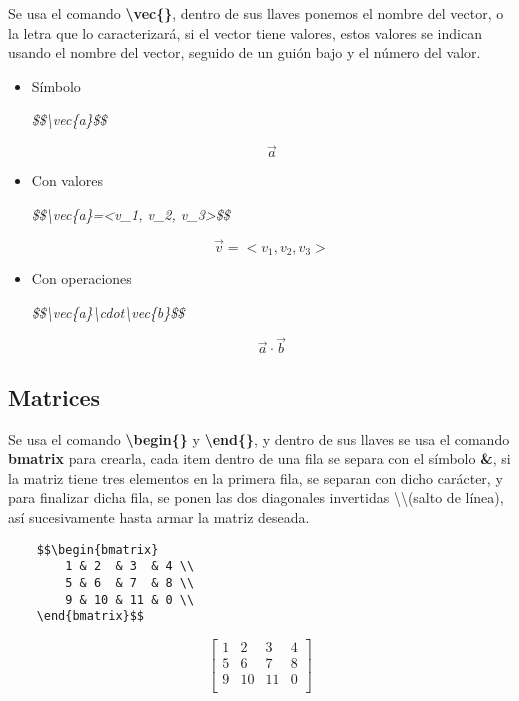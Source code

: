 Se usa el comando \textbf{\textbackslash{vec\{\}}}, dentro de sus llaves ponemos el nombre del vector, o la letra que lo caracterizará, si el vector tiene valores, estos valores se indican usando el nombre del vector, seguido de un guión bajo y el número del valor.
\begin{itemize}
    \item Símbolo
    \begin{center}
        \textit{\$\$\textbackslash{vec\{a\}}\$\$}
    \end{center}
    $$\vec{a}$$
    \item Con valores
    \begin{center}
        \textit{\$\$\textbackslash{vec\{a\}}=\textless v\_1, v\_2, v\_3\textgreater\$\$}
    \end{center}
    $$\vec{v}=<v_1, v_2, v_3>$$
    \item Con operaciones
    \begin{center}
        \textit{\$\$\textbackslash{vec\{a\}}\textbackslash{cdot}\textbackslash{vec\{b\}}\$\$}
    \end{center}
    $$\vec{a}\cdot\vec{b}$$
\end{itemize}


\subsection{Matrices}

Se usa el comando \textbf{\textbackslash{begin\{\}}} y \textbf{\textbackslash{end\{\}}}, y dentro de sus llaves se usa el comando \textbf{bmatrix} para crearla, cada item dentro de una fila se separa con el símbolo \textbf{\&}, si la matriz tiene tres elementos en la primera fila, se separan con dicho carácter, y para finalizar dicha fila, se ponen las dos diagonales invertidas \textbackslash\textbackslash (salto de línea), así sucesivamente hasta armar la matriz deseada.
\begin{lstlisting}
    $$\begin{bmatrix}
        1 & 2  & 3  & 4 \\
        5 & 6  & 7  & 8 \\
        9 & 10 & 11 & 0 \\
    \end{bmatrix}$$
\end{lstlisting}
$$\begin{bmatrix}
    1&2&3&4\\
    5&6&7&8\\
    9&10&11&0\\
\end{bmatrix}$$
